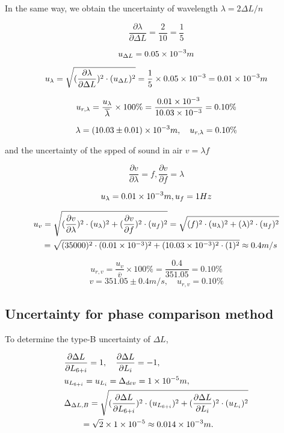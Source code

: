 In the same way, we obtain the uncertainty of wavelength $\lambda=2\Delta L/n$ 


$$\frac{\partial \lambda}{\partial \Delta L}=\frac{2}{10}=\frac{1}{5}$$

$$u_{\Delta L}=0.05\times 10^{-3}m$$

$$u_{\lambda}=\sqrt{(\frac{\partial \lambda}{\partial \Delta L})^2\cdot 
  (u_{\Delta L})^2}
  =\frac{1}{5}\times 0.05\times 10^{-3}=0.01\times 10^{-3}m$$

$$u_{r,\lambda}=\frac{u_{\lambda}}{\overline{\lambda}}\times 
100\%=\frac{0.01\times 10^{-3}}{10.03\times 10^{-3}}=0.10\%$$

$$\lambda=(10.03\pm0.01)\times 10^{-3}m,\quad u_{r,\lambda}=0.10\%$$


and the uncertainty of the spped of sound in air $v=\lambda f$

$$\frac{\partial v}{\partial \lambda}=f,
\frac{\partial v}{\partial f}=\lambda$$

$$u_{\lambda}=0.01\times 10^{-3}m, 
u_{f}=1Hz$$

\[
\begin{split}
&u_{v}=\sqrt{(\frac{\partial v}{\partial \lambda})^2\cdot
  (u_{\lambda})^2+(\frac{\partial v}{\partial f})^2\cdot
  (u_{f})^2}=\sqrt{(f)^2\cdot (u_{\lambda})^2+(\lambda)^2\cdot
  (u_{f})^2}\\ 
&\quad =\sqrt{(35000)^2\cdot(0.01\times 10^{-3})^2+(10.03\times 10^{-3})^2\cdot(1)^2}
\approx0.4m/s\\
\end{split}
\]

$$u_{r,v}=\frac{u_v}{\overline{v}}\times 100\%=\frac{0.4}{351.05}=0.10\%$$
$$v=351.05\pm0.4 m/s,\quad u_{r,v}=0.10\%$$

\subsection{Uncertainty for phase comparison method}

To determine the type-B uncertainty of $\Delta L$,

\[
\begin{split}
    &\frac{\partial \Delta L}{\partial L_{6+i}}=1,\quad \frac{\partial
      \Delta L}{\partial L_i}=-1,\\ 
    &u_{L_{6+i}}=u_{L_i}=\Delta_{dev}=1\times 10^{-5}m,\\
    &\Delta_{\Delta L,B}=\sqrt{(\frac{\partial \Delta L}{\partial
        L_{6+i}})^2\cdot (u_{L_{6+i}})^2+(\frac{\partial \Delta L}{\partial
        L_i})^2\cdot (u_{L_i})^2}\\ 
    &\quad\quad =\sqrt{2}\times 1\times 10^{-5}\approx0.014\times 10^{-3}m.\\ 
\end{split}
\]

